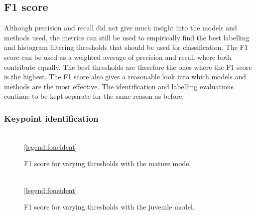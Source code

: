 \subsection{F1 score}
Although precision and recall did not give much insight into the models and methods used, the metrics can still be used to empirically find the best labelling and histogram filtering thresholds that should be used for classification. The F1 score can be used as a weighted average of precision and recall where both contribute equally. The best thresholds are therefore the ones where the F1 score is the highest. The F1 score also gives a reasonable look into which models and methods are the most effective. The identification and labelling evaluations continue to be kept separate for the same reason as before. 
\subsubsection{Keypoint identification}

\begin{figure}[H]
\centering
{}
\\
\ref{legend:foneident}
\caption{F1 score for varying thresholds with the mature model.}
\label{fig:fonemature}
\end{figure}

\begin{figure}[H]
\centering
{}
\\
\ref{legend:foneident}
\caption{F1 score for varying thresholds with the juvenile model.}
\label{fig:fonejuvenile}
\end{figure}

